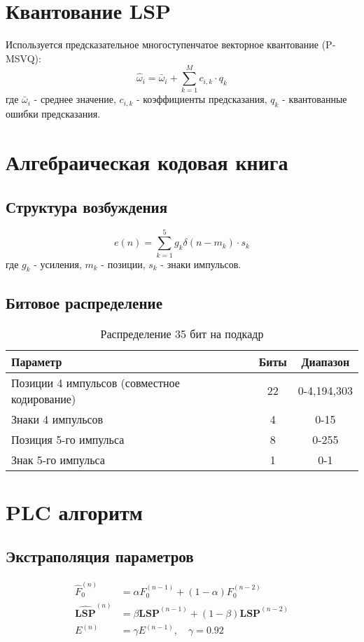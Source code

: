\documentclass{report}
\begin{document}
	\section{Квантование LSP}
	Используется предсказательное многоступенчатое векторное квантование (P-MSVQ):
	\begin{equation}
		\hat{\omega}_i = \bar{\omega}_i + \sum_{k=1}^{M} c_{i,k} \cdot q_k
	\end{equation}
	где $\bar{\omega}_i$ - среднее значение, $c_{i,k}$ - коэффициенты предсказания, $q_k$ - квантованные ошибки предсказания.
	
	\section{Алгебраическая кодовая книга}
	\subsection{Структура возбуждения}
	\begin{equation}
		e(n) = \sum_{k=1}^{5} g_k \delta(n - m_k) \cdot s_k
	\end{equation}
	где $g_k$ - усиления, $m_k$ - позиции, $s_k$ - знаки импульсов.
	
	\subsection{Битовое распределение}
	\begin{table}[H]
		\centering
		\caption{Распределение 35 бит на подкадр}
		\begin{tabular}{lcc}
			\toprule
			\textbf{Параметр} & \textbf{Биты} & \textbf{Диапазон} \\
			\midrule
			Позиции 4 импульсов (совместное кодирование) & 22 & 0-4,194,303 \\
			Знаки 4 импульсов & 4 & 0-15 \\
			Позиция 5-го импульса & 8 & 0-255 \\
			Знак 5-го импульса & 1 & 0-1 \\
			\bottomrule
		\end{tabular}
	\end{table}
	
	\section{PLC алгоритм}
	\subsection{Экстраполяция параметров}
	\begin{align}
		\hat{F}_0^{(n)} &= \alpha F_0^{(n-1)} + (1-\alpha) F_0^{(n-2)} \\
		\hat{\mathbf{LSP}}^{(n)} &= \beta \mathbf{LSP}^{(n-1)} + (1-\beta) \mathbf{LSP}^{(n-2)} \\
		E^{(n)} &= \gamma E^{(n-1)}, \quad \gamma = 0.92
	\end{align}
	
\end{document}
